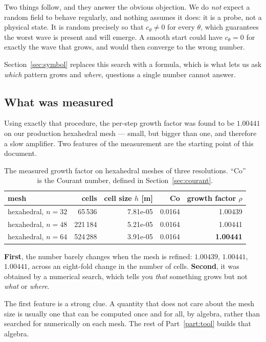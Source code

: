 \documentclass[11pt,a4paper]{article}
\begin{document}
Two things follow, and they answer the obvious objection. We do \emph{not} expect a random
field to behave regularly, and nothing assumes it does: it is a probe, not a physical state. It
is random precisely so that \(c_\theta \ne 0\) for every \(\theta\), which guarantees the worst
wave is present and will emerge. A smooth start could have \(c_\theta = 0\) for exactly the
wave that grows, and would then converge to the wrong number.

Section~\ref{sec:symbol} replaces this search with a formula, which is what lets us ask
\emph{which} pattern grows and \emph{where}, questions a single number cannot answer.

\subsection{What was measured}

Using exactly that procedure, the per-step growth factor was found to be $1.00441$ on our
production hexahedral mesh --- small, but bigger than one, and therefore a slow amplifier. Two
features of the measurement are the starting point of this document.

\begin{table}[h]
\centering
\caption{The measured growth factor on hexahedral meshes of three resolutions.
``Co'' is the Courant number, defined in Section~\ref{sec:courant}.}
\label{tab:measured}
\begin{tabular}{lrrrr}
\toprule
mesh & cells & cell size $h$ [m] & Co & growth factor $\rho$ \\
\midrule
hexahedral, $n=32$ & 65\,536  & 7.81e-05 & 0.0164 & 1.00439 \\
hexahedral, $n=48$ & 221\,184 & 5.21e-05 & 0.0164 & 1.00441 \\
hexahedral, $n=64$ & 524\,288 & 3.91e-05 & 0.0164 & \textbf{1.00441} \\
\bottomrule
\end{tabular}
\end{table}

\textbf{First}, the number barely changes when the mesh is refined: $1.00439$, $1.00441$,
$1.00441$, across an eight-fold change in the number of cells. \textbf{Second}, it was
obtained by a numerical search, which tells you \emph{that} something grows but not
\emph{what} or \emph{where}.

The first feature is a strong clue. A quantity that does not care about the mesh size is
usually one that can be computed once and for all, by algebra, rather than searched for
numerically on each mesh. The rest of Part~\ref{part:tool} builds that algebra.
\end{document}

